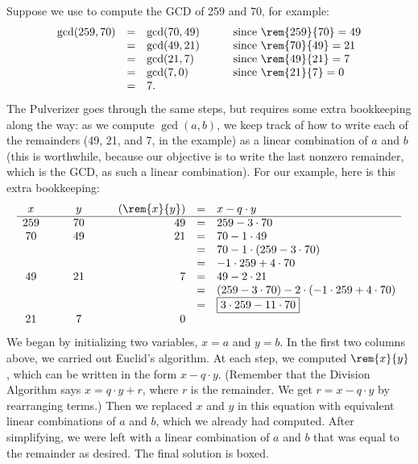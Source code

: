 Suppose we use  to compute the GCD of 259 and
70, for example:
\[
\begin{array}{rclcl}
\gcd(259, 70)
    & = & \gcd(70, 49) & \quad & \text{since $\rem{259}{70} = 49$}\\
    & = & \gcd(49, 21) && \text{since $\rem{70}{49} = 21$} \\
    & = & \gcd(21, 7) && \text{since $\rem{49}{21} = 7$} \\
    & = & \gcd(7, 0) && \text{since $\rem{21}{7} = 0$} \\
    & = & 7.
\end{array}
\]
The Pulverizer goes through the same steps, but requires some extra
bookkeeping along the way: as we compute $\gcd(a, b)$, we keep track
of how to write each of the remainders (49, 21, and 7, in the example)
as a linear combination of $a$ and $b$ (this is worthwhile, because
our objective is to write the last nonzero remainder, which is the
GCD, as such a linear combination).  For our example, here is this
extra bookkeeping:
\[
\begin{array}{ccccrcl}
x & \quad & y & \quad & (\rem{x}{y}) & = & x - q \cdot y \\ \hline
259 && 70 && 49 & = &   259 - 3 \cdot 70 \\
70 && 49 && 21  & = &   70 - 1 \cdot 49 \\
&&&&            & = &   70 - 1 \cdot (259 - 3 \cdot 70) \\
&&&&            & = &   -1 \cdot 259 + 4 \cdot 70 \\
49 && 21 && 7   & = &   49 - 2 \cdot 21 \\
&&&&            & = &   (259 - 3 \cdot 70) -
                                2 \cdot (-1 \cdot 259 + 4 \cdot 70) \\
&&&&            & = &   \fbox{$3 \cdot 259 - 11 \cdot 70$} \\
21 && 7 && 0
\end{array}
\]
We began by initializing two variables, $x = a$ and $y = b$.  In the
first two columns above, we carried out Euclid's algorithm.  At each
step, we computed $\rem{x}{y}$, which can be written in the form $x - q
\cdot y$.  (Remember that the Division Algorithm says $x = q \cdot y +
r$, where $r$ is the remainder.  We get $r = x - q \cdot y$ by
rearranging terms.)  Then we replaced $x$ and $y$ in this equation
with equivalent linear combinations of $a$ and $b$, which we already
had computed.  After simplifying, we were left with a linear
combination of $a$ and $b$ that was equal to the remainder as desired.
The final solution is boxed.

